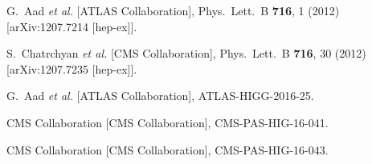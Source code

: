 \documentclass[10pt]{article}
\begin{document}
\begin{thebibliography}{99}


  G.~Aad {\it et al.}  [ATLAS Collaboration],
  Phys.\ Lett.\ B {\bf 716}, 1 (2012)
  [arXiv:1207.7214 [hep-ex]].
  
  
  S.~Chatrchyan {\it et al.}  [CMS Collaboration],
  Phys.\ Lett.\ B {\bf 716}, 30 (2012)
  [arXiv:1207.7235 [hep-ex]].


  G.~Aad {\it et al.}  [ATLAS Collaboration],
  ATLAS-HIGG-2016-25.


  CMS Collaboration [CMS Collaboration],
  CMS-PAS-HIG-16-041.


  CMS Collaboration [CMS Collaboration],
  CMS-PAS-HIG-16-043.


\end{thebibliography}

 
\end{document}
